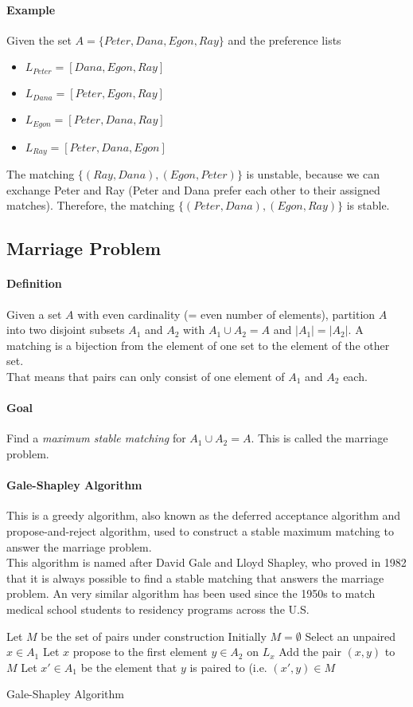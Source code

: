 \documentclass[10pt,a4paper]{book}
\newcommand{\ind}{\hspace*{\parindent}}
\begin{document}
\paragraph*{Example}
Given the set $A = \{Peter, Dana, Egon, Ray\}$ and the preference lists
\begin{itemize}
\item $L_{Peter} = [Dana, Egon, Ray]$
\item $L_{Dana} = [Peter, Egon, Ray]$
\item $L_{Egon} = [Peter, Dana, Ray]$
\item $L_{Ray} = [Peter, Dana, Egon]$
\end{itemize}
The matching $\{(Ray, Dana), (Egon, Peter)\}$ is unstable, because we can exchange Peter and Ray (Peter and Dana prefer each other to their assigned matches). Therefore, the matching $\{(Peter, Dana), (Egon, Ray)\}$ is stable.

\subsection{Marriage Problem}
\paragraph*{Definition}
Given a set $A$ with even cardinality (= even number of elements), partition $A$ into two disjoint subsets $A_1$ and $A_2$ with $A_1 \cup A_2 = A$ and $|A_1| = |A_2|$. A matching is a bijection from the element of one set to the element of the other set.\\
That means that pairs can only consist of one element of $A_1$ and $A_2$ each.
\paragraph*{Goal}
Find a \textit{maximum stable matching} for $A_1 \cup A_2 = A$. This is called the marriage problem.
\paragraph*{Gale-Shapley Algorithm}
This is a greedy algorithm, also known as the deferred acceptance algorithm and propose-and-reject algorithm, used to construct a stable maximum matching to answer the marriage problem. \\
\ind This algorithm is named after David Gale and Lloyd Shapley, who proved in 1982 that it is always possible to find a stable matching that answers the marriage problem. An very similar algorithm has been used since the 1950s to match medical school students to residency programs across the U.S.
\begin{algorithm}
\DontPrintSemicolon
Let $M$ be the set of pairs under construction\;
Initially $M = \emptyset$\;
{Select an unpaired $x \in A_1$\;
Let $x$ propose to the first element $y \in A_2$ on $L_x$\;
{Add the pair $(x,y)$ to $M$}
{Let $x' \in A_1$ be the element that $y$ is paired to (i.e. $(x',y) \in M$\;
}}
\caption{Gale-Shapley Algorithm}
\end{algorithm}
\end{document}
